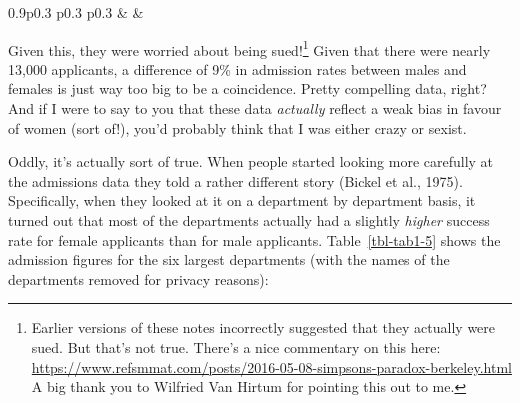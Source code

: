 \documentclass[
  letterpaper,
]{book}
\begin{document}
\begin{table}[ht]
\begin{centerbox}
\begin{threeparttable}
\begin{tabularx}{0.9\textwidth}{p{} p{} p{}}
 &
 &
 \tabularnewline[-0.5pt]


\end{tabularx} 

\end{threeparttable}\par\end{centerbox}

\end{table}
 

Given this, they were worried about being sued!\footnote{Earlier
  versions of these notes incorrectly suggested that they actually were
  sued. But that's not true. There's a nice commentary on this here:
  \url{https://www.refsmmat.com/posts/2016-05-08-simpsons-paradox-berkeley.html}
  A big thank you to Wilfried Van Hirtum for pointing this out to me.}
Given that there were nearly 13,000 applicants, a difference of 9\% in
admission rates between males and females is just way too big to be a
coincidence. Pretty compelling data, right? And if I were to say to you
that these data \emph{actually} reflect a weak bias in favour of women
(sort of!), you'd probably think that I was either crazy or sexist.

Oddly, it's actually sort of true. When people started looking more
carefully at the admissions data they told a rather different story
(Bickel et al., 1975). Specifically, when they looked at it on a
department by department basis, it turned out that most of the
departments actually had a slightly \emph{higher} success rate for
female applicants than for male applicants. Table~\ref{tbl-tab1-5} shows
the admission figures for the six largest departments (with the names of
the departments removed for privacy reasons):

\hypertarget{tbl-tab1-5}{}
 
\end{document}
